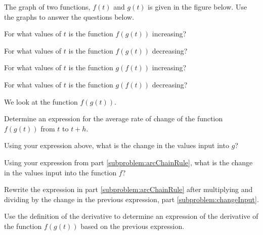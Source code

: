 \begin{problem}
\item The graph of two functions, $f(t)$ and $g(t)$ is given in the
  figure below. Use the graphs to answer the questions below.

  \scalebox{0.75}{}

  \begin{subproblem}
  \item For what values of $t$ is the function $f(g(t))$ increasing?
    \vfill
  \item For what values of $t$ is the function $f(g(t))$ decreasing?
    \vfill
  \item For what values of $t$ is the function $g(f(t))$ increasing?
    \vfill
  \item For what values of $t$ is the function $g(f(t))$ decreasing?
    \vfill
  \end{subproblem}

  \clearpage


\item We look at the function $f(g(t))$.
  \begin{subproblem}
  \item Determine an expression for the average rate of change of the
    function $f(g(t))$ from $t$ to $t+h$.
    \label{subproblem:arcChainRule}
    \vfill
  \item Using your expression above, what is the change in the values input into $g$?
    \vspace{2em}
  \item Using your expression from part \ref{subproblem:arcChainRule},
    what is the change in the values input into the function $f$?
    \label{subproblem:changeInput}
    \vspace{2em}
  \item Rewrite the expression in part \ref{subproblem:arcChainRule}
    after multiplying and dividing by the change in the previous
    expression, part \ref{subproblem:changeInput}.
    \vfill
  \end{subproblem}

\item Use the definition of the derivative to determine an expression
  of the derivative of the function $f(g(t))$ based on the previous
  expression.
  \vspace{5em}

\end{problem}


